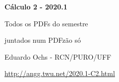 \documentclass[oneside,12pt]{article}
\begin{document}

\def\drafturl{http://angg.twu.net/LATEX/2020-1-C2.pdf}
\def\drafturl{http://angg.twu.net/2020.1-C2.html}
\def\draftfooter{\tiny \href{\drafturl}{\jobname{}} \ColorBrown{\shorttoday{} \hours}}



%

\thispagestyle{empty}

\begin{center}

\vspace*{1.2cm}

{\bf \Large Cálculo 2 - 2020.1}

\bsk

Todos os PDFs do semestre

juntados num PDFzão só

\bsk

Eduardo Ochs - RCN/PURO/UFF

\url{http://angg.twu.net/2020.1-C2.html}

\end{center}

\newpage

\def\incl#1{}

\incl{2020-1-C2-intro}

\incl{2020-1-C2-somas-1}

\incl{2020-1-C2-somas-2}

\incl{2020-1-C2-def-integral}

\incl{2020-1-C2-escadas}
\end{document}
